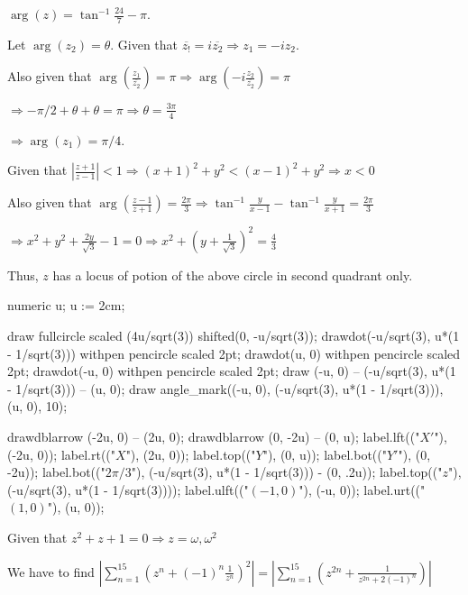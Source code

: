   $\arg(z) = \tan^{-1}\frac{24}{7} - \pi$.
\item Let $\arg(z_2) = \theta$. Given that $\overline{z_!} = i\overline{z_2}\Rightarrow z_1 = -iz_2$.

  Also given that $\arg\left(\frac{z_1}{\overline{z_2}}\right) = \pi \Rightarrow
  \arg\left(-i\frac{z_2}{\overline{z_2}}\right) = \pi$

  $\Rightarrow -\pi/2 + \theta + \theta = \pi \Rightarrow \theta = \frac{3\pi}{4}$

  $\Rightarrow \arg(z_1) = \pi/4$.
\item Given that $\left|\frac{z + 1}{z - 1}\right| < 1 \Rightarrow (x + 1)^2 + y^2 < (x - 1)^2 +
  y^2\Rightarrow x < 0$

  Also given that $\arg\left(\frac{z - 1}{z + 1}\right) = \frac{2\pi}{3}\Rightarrow \tan^{-1}\frac{y}{x - 1}
  - \tan^{-1}\frac{y}{x + 1} = \frac{2\pi}{3}$

  $\Rightarrow x^2 + y^2 + \frac{2y}{\sqrt{3}} - 1 = 0 \Rightarrow x^2 + \left(y +
  \frac{1}{\sqrt{3}}\right)^2 = \frac{4}{3}$

  Thus, $z$ has a locus of potion of the above circle in second quadrant only.

  \startplacefigure[location=force]
    \startMPcode
      numeric u;
      u := 2cm;

      draw fullcircle scaled (4u/sqrt(3)) shifted(0, -u/sqrt(3));
      drawdot(-u/sqrt(3), u*(1 - 1/sqrt(3))) withpen pencircle scaled 2pt;
      drawdot(u, 0) withpen pencircle scaled 2pt;
      drawdot(-u, 0) withpen pencircle scaled 2pt;
      draw (-u, 0) -- (-u/sqrt(3), u*(1 - 1/sqrt(3))) -- (u, 0);
      draw angle_mark((-u, 0), (-u/sqrt(3), u*(1 - 1/sqrt(3))), (u, 0), 10);

      drawdblarrow (-2u, 0) -- (2u, 0);
      drawdblarrow (0, -2u) -- (0, u);
      label.lft(("$X'$"), (-2u, 0));
      label.rt(("$X$"), (2u, 0));
      label.top(("$Y$"), (0, u));
      label.bot(("$Y'$"), (0, -2u));
      label.bot(("$2\pi/3$"), (-u/sqrt(3), u*(1 - 1/sqrt(3))) - (0, .2u));
      label.top(("$z$"), (-u/sqrt(3), u*(1 - 1/sqrt(3))));
      label.ulft(("$(-1, 0)$"), (-u, 0));
      label.urt(("$(1, 0)$"), (u, 0));
    \stopMPcode
  \stopplacefigure
\item Given that $z^2 + z + 1 = 0\Rightarrow z = \omega, \omega^2$

  We have to find $\left|\displaystyle\sum_{n = 1}^{15}\left(z^n +
  (-1)^n\frac{1}{z^n}\right)^2\right| = \left|\displaystyle\sum_{n = 1}^{15}\left(z^{2n} +
  \frac{1}{z^{2n} + 2(-1)^n}\right)\right|$


